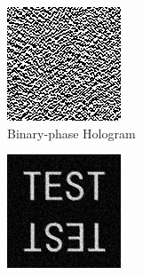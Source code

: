 \begin{figure}[H]
\begin{subfigure}[t]{0.3\textwidth}
    \includegraphics[width=\textwidth]{DBS_test_128_Holo.png}
    \caption{Binary-phase Hologram}
    \label{fig:DBS_test_128_Holo}
  \end{subfigure}
  \hfill
  \begin{subfigure}[t]{0.3\textwidth}
    \centering
    \includegraphics[width=\textwidth]{DBS_test_128_recon_intensity.png}

\end{subfigure}
\end{figure}
